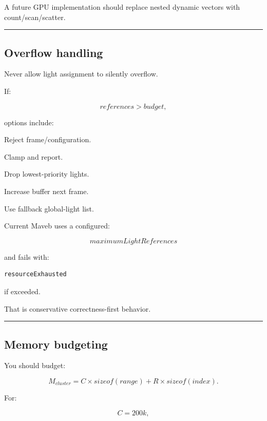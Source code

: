 A future GPU implementation should replace nested dynamic vectors with count/scan/scatter.

\begin{center}\rule{0.5\linewidth}{0.5pt}\end{center}

\subsection{Overflow handling}\label{04-visual-computing-ii-ch040-overflow-handling}

\hypertarget{04-visual-computing-ii-ch040-overflow-handling}{}

Never allow light assignment to silently overflow.

If:

\[
references>budget,
\]

options include:

Reject frame/configuration.

Clamp and report.

Drop lowest-priority lights.

Increase buffer next frame.

Use fallback global-light list.

Current Maveb uses a configured:

\[
maximumLightReferences
\]

and fails with:

\begin{verbatim}
resourceExhausted
\end{verbatim}

if exceeded.

That is conservative correctness-first behavior.

\begin{center}\rule{0.5\linewidth}{0.5pt}\end{center}

\subsection{Memory budgeting}\label{04-visual-computing-ii-ch040-memory-budgeting}

\hypertarget{04-visual-computing-ii-ch040-memory-budgeting}{}

You should budget:

\[
M_{cluster}
=
C\times sizeof(range)
+
R\times sizeof(index).
\]

For:

\[
C=200k,
\]


